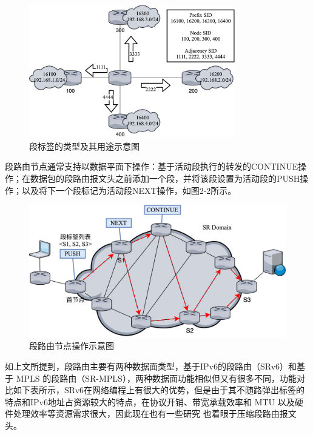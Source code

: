 \begin{figure}[htbp]
\setlength{\abovecaptionskip}{15pt plus 3pt minus 2pt}
\centerline{\includegraphics[width=0.8\textwidth]{./figures/ch2-kinds-of-SID.png}}
\caption{段标签的类型及其用途示意图}
\label{fig-ch2-kinds-of-SID}
\end{figure}

段路由节点通常支持以数据平面下操作：基于活动段执行的转发的CONTINUE操作；在数据包的段路由报文头之前添加一个段，并将该段设置为活动段的PUSH操作；以及将下一个段标记为活动段NEXT操作，如图2-2所示。

\begin{figure}[htbp]
\setlength{\abovecaptionskip}{15pt plus 3pt minus 2pt}
\centerline{\includegraphics[width=1\textwidth]{./figures/ch2-SR-actions.png}}
\caption{段路由节点操作示意图}
\label{fig-ch2-SR-actions}
\end{figure}

如上文所提到，段路由主要有两种数据面类型，基于IPv6的段路由（SRv6）和基于 \gls*{MPLS} 的段路由（SR-MPLS），两种数据面功能相似但又有很多不同，功能对比如下表所示，SRv6在网络编程上有很大的优势，但是由于其不随路弹出标签的特点和IPv6地址占资源较大的特点，在协议开销、带宽承载效率和 \gls*{MTU} 以及硬件处理效率等资源需求很大，因此现在也有一些研究 \cite{GSID} \cite{MICROSID} \cite{USID} 也着眼于压缩段路由报文头。

